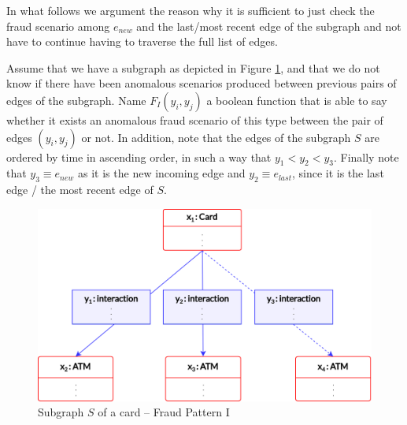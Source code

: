In what follows we argument the reason why it is sufficient to just check the fraud scenario among $e_{new}$ and the last/most recent edge of the subgraph and not have to continue having to traverse the full list of edges.

Assume that we have a subgraph as depicted in Figure \ref{img:fp-I-demo}, and that we do not know if there have been anomalous scenarios produced between previous pairs of edges of the subgraph. Name $F_I(y_i,y_j)$ a boolean function that is able to say whether it exists an anomalous fraud scenario of this type between the pair of edges $(y_i,y_j)$ or not. In addition, note that the edges of the subgraph $S$ are ordered by time in ascending order, in such a way that $y_1 < y_2 < y_3$. Finally note that $y_3 \equiv e_{new}$ as it is the new incoming edge and $y_2 \equiv e_{last}$, since it is the last edge / the most recent edge of $S$.

\begin{figure}[H]
  \centering
  \includegraphics[scale = 0.6]{images/2-QueryModel/fp-I-demo-1.png}
  \caption{Subgraph $S$ of a card -- Fraud Pattern I}
  \label{img:fp-I-demo}
\end{figure}

